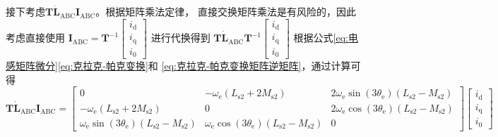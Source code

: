 接下考虑\(\bm{T}\dot{\bm{L}}_{\mathrm{ABC}}\bm{I}_{\mathrm{ABC}}\)。根据矩阵乘法定律，
直接交换矩阵乘法是有风险的，因此考虑直接使用
\(\bm{I}_{\mathrm{ABC}}=\bm{T}^{-1}\begin{bmatrix}i_{\mathrm{d}}\\i_{\mathrm{q}}\\i_{\mathrm{0}}\end{bmatrix}\)
进行代换得到
\(\bm{T}\dot{\bm{L}}_{\mathrm{ABC}}\bm{T}^{-1}\begin{bmatrix}i_{\mathrm{d}}\\i_{\mathrm{q}}\\i_{\mathrm{0}}\end{bmatrix}\)
根据公式\eqref{eq:电感矩阵微分}\eqref{eq:克拉克-帕克变换}和
\eqref{eq:克拉克-帕克变换矩阵逆矩阵}，通过计算可得
\begin{equation*}
    \bm{T}\dot{\bm{L}}_{\mathrm{ABC}}\bm{I}_{\mathrm{ABC}}=
    \begin{bmatrix}
        0&-\omega_{\mathrm{e}}(L_{\mathrm{s}2}+2M_{\mathrm{s}2})&2\omega_{\mathrm{e}}\sin(3\theta_{\mathrm{e}})(L_{\mathrm{s}2}-M_{\mathrm{s}2})
        \\-\omega_{\mathrm{e}}(L_{\mathrm{s}2}+2M_{\mathrm{s}2})&0&2\omega_{\mathrm{e}}\cos(3\theta_{\mathrm{e}})(L_{\mathrm{s}2}-M_{\mathrm{s}2})
        \\\omega_{\mathrm{e}}\sin(3\theta_{\mathrm{e}})(L_{\mathrm{s}2}-M_{\mathrm{s}2})
        &\omega_{\mathrm{e}}\cos(3\theta_{\mathrm{e}})(L_{\mathrm{s}2}-M_{\mathrm{s}2})&0
    \end{bmatrix}
    \begin{bmatrix}i_{\mathrm{d}}\\i_{\mathrm{q}}\\i_{\mathrm{0}}\end{bmatrix}
\end{equation*}

